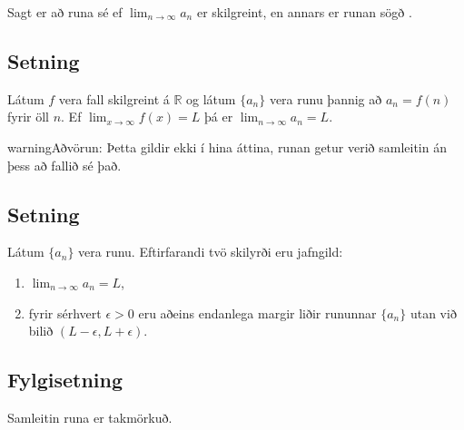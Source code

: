 \documentclass[a4paper,10pt,icelandic]{sphinxmanual}
\begin{document}
Sagt er að runa sé  ef \(\lim_{n\rightarrow \infty}a_n\)
er skilgreint, en annars er runan sögð .


\subsection{Setning}
\label{\detokenize{kafli09:setning}}
Látum \(f\) vera fall skilgreint á \({{\mathbb  R}}\) og látum
\(\{a_n\}\) vera runu þannig að \(a_n=f(n)\) fyrir öll
\(n\). Ef \(\lim_{x\rightarrow
\infty}f(x)=L\) þá er \(\lim_{n\rightarrow\infty}a_n=L\).

\begin{sphinxadmonition}{warning}{Aðvörun:}
Þetta gildir ekki í hina áttina, runan getur verið
samleitin án þess að fallið sé það.
\end{sphinxadmonition}


\subsection{Setning}
\label{\detokenize{kafli09:id3}}
Látum \(\{a_n\}\) vera runu. Eftirfarandi tvö skilyrði eru jafngild:
\begin{enumerate}
\item {} 
\(\lim_{n\rightarrow\infty}a_n=L\),

\item {} 
fyrir sérhvert \(\epsilon>0\) eru aðeins endanlega margir liðir
rununnar \(\{a_n\}\) utan við bilið
\((L-\epsilon, L+\epsilon)\).

\end{enumerate}


\subsection{Fylgisetning}
\label{\detokenize{kafli09:fylgisetning}}
Samleitin runa er takmörkuð.
\end{document}
